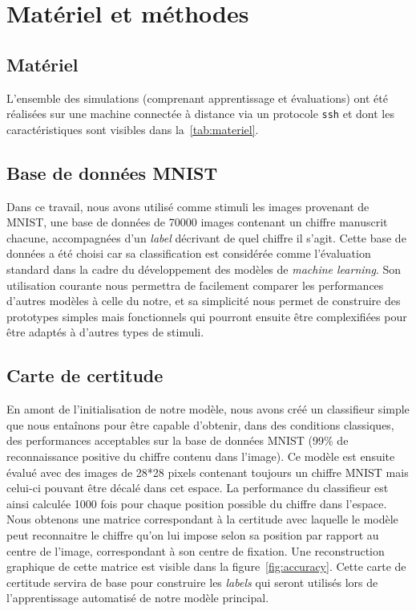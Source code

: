 \chapter{Matériel et méthodes} %
\label{Materiel_methode} %

\section{Matériel}
L'ensemble des simulations (comprenant apprentissage et évaluations) ont été réalisées sur une machine connectée à distance via un protocole \verb+ssh+ et dont les caractéristiques sont visibles dans la~\autoref{tab:materiel}.

\section{Base de données MNIST}
Dans ce travail, nous avons utilisé comme stimuli les images provenant de MNIST, une base de données de 70000 images contenant un chiffre manuscrit chacune, accompagnées d'un \textit{label} décrivant de quel chiffre il s'agit. 
Cette base de données a été choisi car sa classification est considérée comme l'évaluation standard dans la cadre du développement des modèles de \textit{machine learning}. Son utilisation courante nous permettra de facilement comparer les performances d'autres modèles à celle du notre, et sa simplicité nous permet de construire des prototypes simples mais fonctionnels qui pourront ensuite être complexifiées pour être adaptés à d'autres types de stimuli.

\section{Carte de certitude}
En amont de l'initialisation de notre modèle, nous avons créé un classifieur simple que nous entaînons pour être capable d'obtenir, dans des conditions classiques, des performances acceptables sur la base de données MNIST (99\% de reconnaissance positive du chiffre contenu dans l'image).
Ce modèle est ensuite évalué avec des images de 28*28 pixels contenant toujours un  chiffre MNIST mais celui-ci pouvant être décalé dans cet espace.
La performance du classifieur est ainsi calculée 1000 fois pour chaque position possible du chiffre dans l'espace. 
Nous obtenons une matrice correspondant à la certitude avec laquelle le modèle peut reconnaitre le chiffre qu'on lui impose selon sa position par rapport au centre de l'image, correspondant à son centre de fixation.
Une reconstruction graphique de cette matrice est visible dans la figure~\ref{fig:accuracy}.
Cette carte de certitude servira de base pour construire les \textit{labels} qui seront utilisés lors de l'apprentissage automatisé de notre modèle principal.

